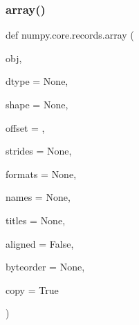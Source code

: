 \subsubsection{\texorpdfstring{array()}{array()}}
{\footnotesize\ttfamily def numpy.\+core.\+records.\+array (\begin{DoxyParamCaption}\item[{}]{obj,  }\item[{}]{dtype = {\ttfamily None},  }\item[{}]{shape = {\ttfamily None},  }\item[{}]{offset = {},  }\item[{}]{strides = {\ttfamily None},  }\item[{}]{formats = {\ttfamily None},  }\item[{}]{names = {\ttfamily None},  }\item[{}]{titles = {\ttfamily None},  }\item[{}]{aligned = {\ttfamily False},  }\item[{}]{byteorder = {\ttfamily None},  }\item[{}]{copy = {\ttfamily True} }\end{DoxyParamCaption})}

